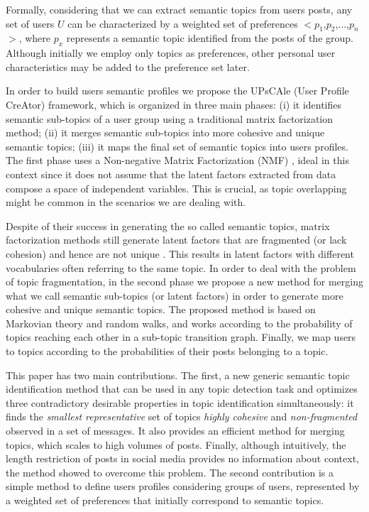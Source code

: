 Formally, considering that we can extract semantic topics from users posts, any
set of users $U$ can be characterized by a weighted set of preferences
$<$$p_1$,$p_2$,$\ldots$,$p_n$$>$, where $p_x$ represents a semantic topic
identified from the posts of the group. Although initially we employ only
topics as preferences, other personal user characteristics may be added to
the preference set later.

In order to build users semantic profiles we propose the UPsCAle (User Profile
CreAtor) framework, which is organized in three main phases: (i) it identifies
semantic sub-topics of a user group using a traditional matrix factorization
method; (ii) it merges semantic sub-topics into more cohesive and unique
semantic topics; (iii) it maps the final set of semantic topics into users
profiles. The first phase uses a Non-negative Matrix Factorization (NMF)
\cite{berry2007algorithms} , ideal in this context since it does not assume that the latent
factors extracted from data compose a space of independent variables. This is
crucial, as topic overlapping might be common in the scenarios we are dealing
with.

Despite of their success in generating the so called semantic topics, matrix
factorization methods still generate latent factors that are fragmented (or
lack cohesion) and hence are not unique \cite{cheng:2013}. This results in latent factors
with different vocabularies often referring to the same topic. In order to deal
with the problem of topic fragmentation, in the second phase we propose a new
method for merging what we call semantic sub-topics (or latent factors) in
order to generate more cohesive and unique semantic topics. The proposed
method is based on Markovian theory and random walks, and works according to
the probability of topics reaching each other in a sub-topic transition graph.
Finally, we map users to topics according to the probabilities of their posts
belonging to a topic. 

This paper has two main contributions. The first, a new generic semantic topic
identification method that can be used in any topic detection task and
optimizes three contradictory desirable properties in topic identification
simultaneously: it finds the \textit{smallest representative} set of topics
\textit{highly cohesive} and \textit{non-fragmented} observed in a set of
messages. It also provides an efficient method for merging topics, which scales
to high volumes of posts. Finally, although intuitively, the length restriction
of posts in social media provides no information about context, the method
showed to overcome this problem.  The second contribution is a simple method to
define users profiles considering groups of users, represented by a weighted
set of preferences that initially correspond to semantic topics. 

